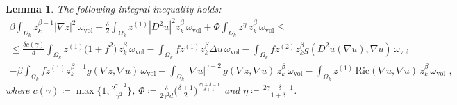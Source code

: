 \documentclass[10pt, a4paper, reqno, oneside]{amsart}
\theoremstyle{plain}
\theoremstyle{definition}
\theoremstyle{plain}
\newtheorem{lemma}[theo]{Lemma}
\theoremstyle{definition}
\theoremstyle{plain}
\renewcommand{\=}{:=}
\begin{document}
\begin{lemma}
The following integral inequality holds:
\begin{multline} \label{mainineq}
\beta \int_{\Omega_k}z_k^{\beta-1}|\nabla z|^2\, \omega_{\mathrm{vol}}
+\tfrac{\delta}2 \int_{\Omega_k} z^{(1)}|D^2u|^2z_k^{\beta} \, \omega_{\mathrm{vol}}
+\Phi \int_{\Omega_k} z^{\eta} \, z_k^{\beta}\, \omega_{\mathrm{vol}} \leq \\
\leq \tfrac{\delta c(\gamma)}{d} \int_{\Omega_k} z^{(1)}\big(1+f^2\big) \, z_k^{\beta}\, \omega_{\mathrm{vol}}
-\int_{\Omega_k} fz^{(1)}z_k^{\beta}\Delta u\, \omega_{\mathrm{vol}}
-\int_{\Omega_k} fz^{(2)}z_k^{\beta}g(D^2u(\nabla u),\nabla u)\, \omega_{\mathrm{vol}} \\
-\beta \int_{\Omega_k} f z^{(1)}z_k^{\beta-1}g(\nabla z,\nabla u)\, \omega_{\mathrm{vol}}
-\int_{\Omega_k} |\nabla u|^{\gamma-2} \, g(\nabla z,\nabla u) \, z_k^{\beta} \, \omega_{\mathrm{vol}} 
-\int_{\Omega_k} z^{(1)} \, \mathrm{Ric}(\nabla u,\nabla u) \, z_k^{\beta} \, \omega_{\mathrm{vol}} \,\, ,
\end{multline}
where $c(\gamma) \coloneqq \max\big\{1,\tfrac{2^{\gamma-2}}{\gamma^2}\big\}$, $\Phi \coloneqq \tfrac{\delta}{2\gamma^2 d} \big(\tfrac{\delta+1}2\big)^{\frac{2\gamma+\delta-1}{\delta+1}}$ and $\eta \coloneqq \frac{2\gamma+\delta-1}{1+\delta}$.
\end{lemma}
\end{document}
